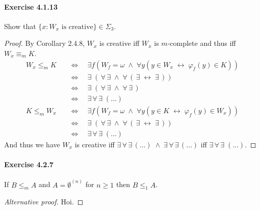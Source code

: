 \documentclass[a4paper,11pt]{article}
\begin{document}
\paragraph{Exercise 4.1.13}

Show that $\{ x : W_x \text{ is creative}\} \in \Sigma_3$.
\begin{proof}
By Corollary 2.4.8, $W_x$ is creative iff $W_x$ is $m$-complete and thus iff $W_x \equiv_m K$.
\begin{align*}
  W_x \leq_m K \quad & \Leftrightarrow \quad \exists f(W_f = \omega \; \wedge \; \forall y(y \in W_x \; \leftrightarrow \; \varphi_f(y) \in K))\\
  & \Leftrightarrow \quad \exists \; ( \, \forall \, \exists \; \wedge \; \forall \, ( \, \exists \; \leftrightarrow \; \exists \, ))\\
  & \Leftrightarrow \quad \exists \; ( \, \forall \, \exists \; \wedge \; \forall \, \exists \, )\\
  & \Leftrightarrow \quad \exists \, \forall \, \exists \; (\ldots)
\end{align*}
\begin{align*}
  K \leq_m W_x \quad & \Leftrightarrow \quad \exists f(W_f = \omega \; \wedge \; \forall y(y \in K \; \leftrightarrow \; \varphi_f(y) \in W_x))\\
  & \Leftrightarrow \quad \exists \; ( \, \forall \, \exists \; \wedge \; \forall \, ( \, \exists \; \leftrightarrow \; \exists \, ))\\
  & \Leftrightarrow \quad \exists \, \forall \, \exists \; (\ldots)
\end{align*}
And thus we have $W_x$ is creative iff $\exists \, \forall \, \exists \, (\ldots) \; \wedge \; \exists \, \forall \, \exists \, (\ldots)$ iff $\exists \, \forall \, \exists \; (\ldots)$.
\end{proof}



\paragraph{Exercise 4.2.7}

If $B \leq_m A$ and $A = \emptyset^{(n)}$ for $n \geq 1$ then $B \leq_1 A$.
\begin{proof}[Alternative proof]
Hoi.

\end{proof}
\end{document}
